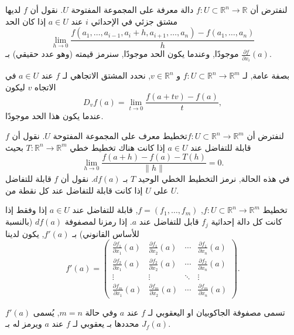 \begin{definition}
    
لنفترض أن \(f : U \subset \mathbb{R}^n \to \mathbb{R}\) دالة معرفة على المجموعة المفتوحة \(U\). نقول أن \(f\) لديها مشتق جزئي في الإحداثي \(i\) عند \(a \in U\) إذا كان الحد
\[ \lim_{h \to 0} \frac{f(a_1, \ldots, a_{i-1}, a_i + h, a_{i+1}, \ldots, a_n) - f(a_1, \ldots, a_n)}{h} \]
موجودًا, وعندما يكون الحد موجودًا, سنرمز قيمته (وهو عدد حقيقي) بـ \(\frac{\partial f}{\partial x_i}(a)\).
\end{definition}

بصفة عامة, لـ \(f : U \subset \mathbb{R}^n \to \mathbb{R}^m\) و \(v \in \mathbb{R}^n\), نحدد المشتق الاتجاهي لـ \(f\) عند \(a \in U\) في الاتجاه \(v\) ليكون
\[ D_v f(a) = \lim_{t \to 0} \frac{f(a + tv) - f(a)}{t}, \]
عندما يكون هذا الحد موجودًا.

\begin{definition}
لنفترض أن \(f : U \subset \mathbb{R}^n \to \mathbb{R}^m\)تخطيط معرف  على المجموعة المفتوحة \(U\). نقول أن \(f\) قابلة للتفاضل عند \(a \in U\) إذا كانت هناك تخطيط خطي  \(T : \mathbb{R}^n \to \mathbb{R}^m\) بحيث
\[ \lim_{h \to 0} \frac{f(a + h) - f(a) - T(h)}{\|h\|} = 0. \]
في هذه الحالة, نرمز التخطيط الخطي الوحيد \(T\) بـ \(df(a)\). نقول أن \(f\) قابلة للتفاضل على \(U\) إذا كانت قابلة للتفاضل عند كل نقطة من \(U\).

تخطيط \(f : U \subset \mathbb{R}^n \to \mathbb{R}^m\), \(f = (f_1, \ldots, f_m)\), قابلة للتفاضل عند \(a \in U\) إذا وفقط إذا كانت كل دالة إحداثية \(f_j\) قابل للتفاضل عند \(a\). إذا رمزنا لمصفوفة \(df(a)\) (بالنسبة للأساس القانوني) بـ \(f'(a)\), يكون لدينا
\[ f'(a) = \begin{pmatrix}
\frac{\partial f_1}{\partial x_1}(a) & \frac{\partial f_1}{\partial x_2}(a) & \cdots & \frac{\partial f_1}{\partial x_n}(a) \\
\frac{\partial f_2}{\partial x_1}(a) & \frac{\partial f_2}{\partial x_2}(a) & \cdots & \frac{\partial f_2}{\partial x_n}(a) \\
\vdots & \vdots & \ddots & \vdots \\
\frac{\partial f_m}{\partial x_1}(a) & \frac{\partial f_m}{\partial x_2}(a) & \cdots & \frac{\partial f_m}{\partial x_n}(a)
\end{pmatrix}. \]
\end{definition}

 \(f'(a)\) تسمى
 مصفوفة الجاكوبيان او اليعقوبي لـ
\(f\) عند \(a\) وفي حالة \(m = n\), يُسمى محددها بـ يعقوبي لـ \(f\) عند \(a\) ويرمز له بـ \(J_f(a)\).


